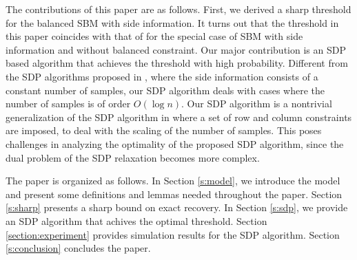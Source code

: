 \documentclass[conference]{IEEEtran}
\begin{document}
	The contributions of this paper are as follows. 
	First, we derived a sharp threshold for the balanced SBM with side information. It turns out that the threshold in this paper coincides with that of \cite{abbe17sideinfo} for the special case of SBM with side information and without balanced constraint. 
	Our major contribution is an SDP based algorithm that achieves the threshold with high probability. Different from the SDP algorithms proposed in \cite{esmaeili2019exact,esmaeili2019b,esmaeili2020a}, where the side information consists of a constant number of samples, our SDP algorithm deals with cases where the number of samples is of order $O(\log n)$. Our SDP algorithm is a nontrivial generalization of the SDP algorithm in \cite{abbe2015exact} where a set of row and column constraints are imposed, to deal with the scaling of the number of samples. This poses challenges in analyzing the optimality of the proposed SDP algorithm, since the dual problem of the SDP relaxation becomes more complex.    
	
	
	The paper is organized as follows. 
	In Section \ref{s:model}, we introduce the model and present some definitions and lemmas needed throughout the paper. Section \ref{s:sharp} presents a sharp bound on exact recovery. In Section \ref{s:sdp}, we provide an SDP algorithm that achives the optimal threshold. Section \ref{section:experiment} provides simulation results for the SDP algorithm. Section \ref{s:conclusion} concludes the paper.
	
\end{document}
